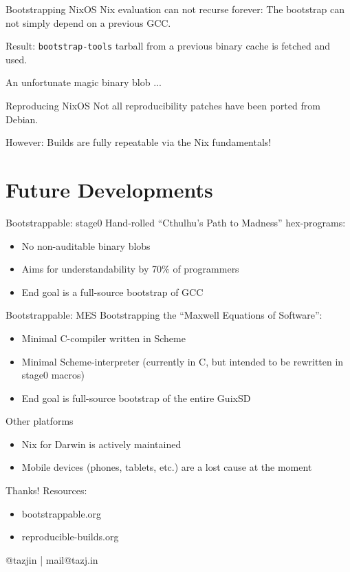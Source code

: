 \documentclass[12pt]{beamer}
\begin{document}
  \begin{frame}{Bootstrapping NixOS}
    Nix evaluation can not recurse forever: The bootstrap can not
    simply depend on a previous GCC.

    Result: \texttt{bootstrap-tools} tarball from a previous binary
    cache is fetched and used.

    An unfortunate magic binary blob ...
  \end{frame}

  \begin{frame}{Reproducing NixOS}
    Not all reproducibility patches have been ported from Debian.

    However: Builds are fully repeatable via the Nix fundamentals!
  \end{frame}

  \section{Future Developments}

  \begin{frame}{Bootstrappable: stage0}
    Hand-rolled ``Cthulhu's Path to Madness'' hex-programs:

    \begin{itemize}
    \item No non-auditable binary blobs
    \item Aims for understandability by 70\% of programmers
    \item End goal is a full-source bootstrap of GCC
    \end{itemize}
  \end{frame}


  \begin{frame}{Bootstrappable: MES}
    Bootstrapping the ``Maxwell Equations of Software'':

    \begin{itemize}
    \item Minimal C-compiler written in Scheme
    \item Minimal Scheme-interpreter (currently in C, but intended to
      be rewritten in stage0 macros)
    \item End goal is full-source bootstrap of the entire GuixSD
    \end{itemize}
  \end{frame}

  \begin{frame}{Other platforms}
    \begin{itemize}
    \item Nix for Darwin is actively maintained
    \item Mobile devices (phones, tablets, etc.) are a lost cause at
      the moment
    \end{itemize}
  \end{frame}

  \begin{frame}{Thanks!}
    Resources:
    \begin{itemize}
    \item bootstrappable.org
    \item reproducible-builds.org
    \end{itemize}

    @tazjin | mail@tazj.in
  \end{frame}
\end{document}
